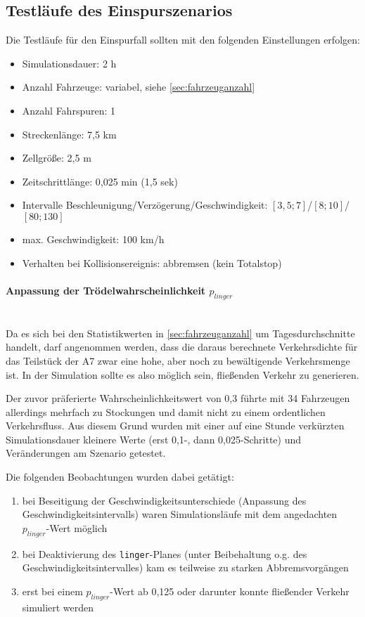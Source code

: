 


\subsection{Testläufe des Einspurszenarios}
\label{sec:test-singlelane}

Die Testläufe für den Einspurfall sollten mit den folgenden Einstellungen erfolgen:
\begin{itemize}
	\itemsep0em
	\item Simulationsdauer: 2 h
	\item Anzahl Fahrzeuge: variabel, siehe \cref{sec:fahrzeuganzahl}
	\item Anzahl Fahrspuren: 1
	\item Streckenlänge: 7,5 km 
	\item Zellgröße: 2,5 m
	\item Zeitschrittlänge: 0,025 min (1,5 sek)
	\item Intervalle Beschleunigung/Verzögerung/Geschwindigkeit: $ [3,5; 7] $/$ [8; 10] $/$ [80; 130] $
	\item max. Geschwindigkeit: 100 km/h
	\item Verhalten bei Kollisionsereignis: abbremsen (kein Totalstop)
\end{itemize}


\paragraph*{Anpassung der Trödelwahrscheinlichkeit $p_{linger}$}
\label{sec:adjust-linger}
\hfill \\
Da es sich bei den Statistikwerten in \cref{sec:fahrzeuganzahl} um Tagesdurchschnitte handelt, darf angenommen werden, dass die daraus berechnete Verkehrsdichte für das Teilstück der A7 zwar eine hohe, aber noch zu bewältigende Verkehrsmenge ist.
In der Simulation sollte es also möglich sein, fließenden Verkehr zu generieren.

Der zuvor präferierte Wahrscheinlichkeitswert von 0,3 führte mit 34 Fahrzeugen allerdings mehrfach zu Stockungen und damit nicht zu einem ordentlichen Verkehrsfluss.
Aus diesem Grund wurden mit einer auf eine Stunde verkürzten Simulationsdauer kleinere Werte (erst 0,1-, dann 0,025-Schritte) und Veränderungen am Szenario getestet.

Die folgenden Beobachtungen wurden dabei getätigt:
\begin{enumerate}
	\itemsep0em
	\item bei Beseitigung der Geschwindigkeitsunterschiede (Anpassung des Geschwindigkeitsintervalls) waren Simulationsläufe mit dem angedachten $p_{linger}$-Wert möglich
	\item bei Deaktivierung des \texttt{linger}-Planes (unter Beibehaltung o.g. des Geschwindigkeitsintervalles) kam es teilweise zu starken Abbremsvorgängen
	\item erst bei einem $p_{linger}$-Wert ab 0,125 oder darunter konnte fließender Verkehr simuliert werden
\end{enumerate}

